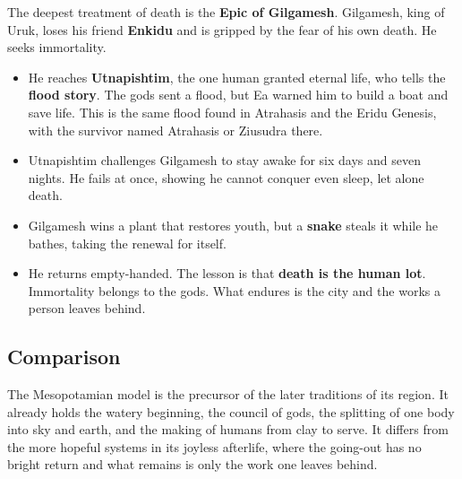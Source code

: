 The deepest treatment of death is the \textbf{Epic of Gilgamesh}. Gilgamesh, king of Uruk, loses his friend \textbf{Enkidu} and is gripped by the fear of his own death. He seeks immortality.

\begin{itemize}
 \item He reaches \textbf{Utnapishtim}, the one human granted eternal life, who tells the \textbf{flood story}. The gods sent a flood, but Ea warned him to build a boat and save life. This is the same flood found in Atrahasis and the Eridu Genesis, with the survivor named Atrahasis or Ziusudra there.
 \item Utnapishtim challenges Gilgamesh to stay awake for six days and seven nights. He fails at once, showing he cannot conquer even sleep, let alone death.
 \item Gilgamesh wins a plant that restores youth, but a \textbf{snake} steals it while he bathes, taking the renewal for itself.
 \item He returns empty-handed. The lesson is that \textbf{death is the human lot}. Immortality belongs to the gods. What endures is the city and the works a person leaves behind.
\end{itemize}

\subsection{Comparison}

The Mesopotamian model is the precursor of the later traditions of its region. It already holds the watery beginning, the council of gods, the splitting of one body into sky and earth, and the making of humans from clay to serve. It differs from the more hopeful systems in its joyless afterlife, where the going-out has no bright return and what remains is only the work one leaves behind.
